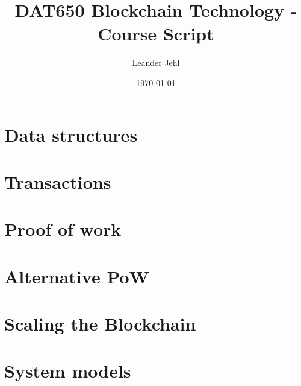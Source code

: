 \documentclass[a4paper,11pt]{report}
\begin{document}
	\title{DAT650 Blockchain Technology - Course Script}
	\author{Leander Jehl}
	\date{\today}
	
	\maketitle

\chapter{Data structures}
	\label{ch:hashchain}






\chapter{Transactions}



\chapter{Proof of work}



\chapter{Alternative PoW}


\chapter{Scaling the Blockchain}


\chapter{System models}

\end{document}
